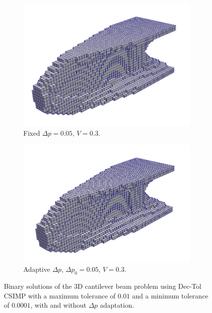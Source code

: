   \begin{figure}
    \begin{subfigure}{0.45\textwidth}
      \includegraphics[width=1\textwidth]{images/adaptive_csimp/cantilever3d_false}
      \caption{Fixed $\Delta p = 0.05$, $V = 0.3$.}
    \end{subfigure} \hfill
    \begin{subfigure}{0.45\textwidth}
      \includegraphics[width=1\textwidth]{images/adaptive_csimp/cantilever3d_true}
      \caption{Adaptive $\Delta p$, $\Delta p_0 = 0.05$, $V = 0.3$.}
    \end{subfigure}

    \caption{Binary solutions of the 3D cantilever beam problem using Dec-Tol CSIMP with a maximum tolerance of $0.01$ and a minimum tolerance of $0.0001$, with and without $\Delta p$ adaptation.}
    \label{fig:dec_tol_tops2}
  \end{figure}

